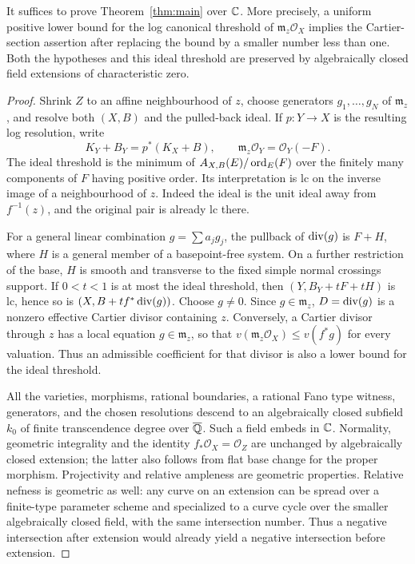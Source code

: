 \begin{lemma}\label{lem:H-field-reduction}
It suffices to prove Theorem~\ref{thm:main} over $\mathbb C$.  More precisely, a
uniform positive lower bound for the log canonical threshold of
$\mathfrak m_z\mathcal O_X$ implies the Cartier-section assertion after
replacing the bound by a smaller number less than one.  Both the hypotheses
and this ideal threshold are preserved by algebraically closed field
extensions of characteristic zero.
\end{lemma}
\begin{proof}
Shrink $Z$ to an affine neighbourhood of $z$, choose generators
$g_1,\ldots,g_N$ of $\mathfrak m_z$, and resolve both $(X,B)$ and the
pulled-back ideal.  If $p:Y\to X$ is the resulting log resolution, write
\[
 K_Y+B_Y=p^*(K_X+B),\qquad
 \mathfrak m_z\mathcal O_Y=\mathcal O_Y(-F).
\]
The ideal threshold is the minimum of
$A_{X,B}(E)/\operatorname{ord}_E(F)$ over the finitely many components of $F$ having
positive order.  Its interpretation is lc on the inverse image of a
neighbourhood of $z$.  Indeed the ideal is the unit ideal away from
$f^{-1}(z)$, and the original pair is already lc there.

For a general linear combination $g=\sum a_jg_j$, the pullback of
$\operatorname{div}(g)$ is $F+H$, where $H$ is a general member of a basepoint-free
system.  On a further restriction of the base, $H$ is smooth and transverse
to the fixed simple normal crossings support.  If $0<t<1$ is at most the
ideal threshold, then $(Y,B_Y+tF+tH)$ is lc, hence so is
$(X,B+t f^*\operatorname{div}(g))$.  Choose $g\ne0$.  Since $g\in\mathfrak m_z$,
$D=\operatorname{div}(g)$ is a nonzero effective Cartier divisor containing $z$.
Conversely, a Cartier divisor through $z$ has a local equation
$g\in\mathfrak m_z$, so that $v(\mathfrak m_z\mathcal O_X)\le v(f^*g)$
for every valuation.  Thus an admissible coefficient for that divisor is
also a lower bound for the ideal threshold.

All the varieties, morphisms, rational boundaries, a rational Fano type
witness, generators, and the chosen resolutions descend to an
algebraically closed subfield $k_0$ of finite transcendence degree over
$\overline{\mathbb Q}$.  Such a field embeds in $\mathbb C$.  Normality, geometric
integrality and the identity $f_*\mathcal O_X=\mathcal O_Z$ are unchanged
by algebraically closed extension; the latter also follows from flat base
change for the proper morphism.  Projectivity and relative ampleness are
geometric properties.  Relative nefness is geometric as well: any curve
on an extension can be spread over a finite-type parameter scheme and
specialized to a curve cycle over the smaller algebraically closed field,
with the same intersection number.  Thus a negative intersection after
extension would already yield a negative intersection before extension.


\end{proof}
